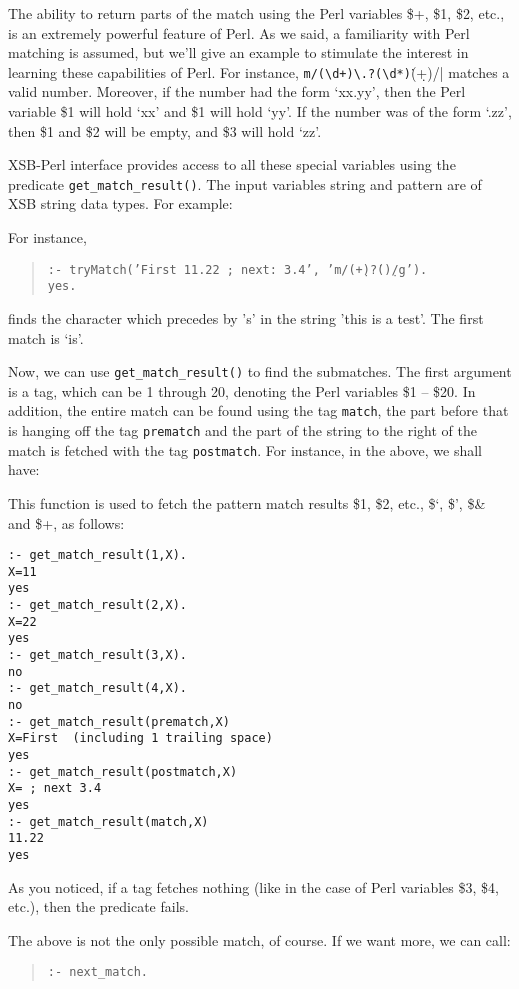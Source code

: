 The ability to return parts of the match using the Perl variables {\$}+,
{\$}1, {\$}2, etc., is an extremely powerful feature of Perl.
As we said, a familiarity with Perl matching is assumed, but we'll give an
example to stimulate the interest in learning these capabilities of Perl.
For instance, \verb|m/(\d+)\.?(\d*)|\.(\d+)/| matches a valid
number. Moreover, if the number had the form `xx.yy', then the Perl variable
\$1 will hold `xx' and \$1 will hold `yy'. If the number was of the form
`.zz', then \$1 and \$2 will be empty, and \$3 will hold `zz'.

XSB-Perl interface provides access to all these special variables using the
predicate {\tt get\_match\_result()}.
The input variables string
and pattern are of XSB string data types. For example:

For instance,
\begin{quote}
 {\tt :- tryMatch('First 11.22 ; next: 3.4', 'm/(\d+)\.?(\d*)/g'). }\\
 {\tt yes.}  
\end{quote}
finds the character which precedes by 's' in the string 'this is a
test'. The first match is `is'.

Now, we can use {\tt get\_match\_result()} to find the submatches.  The
first argument is a tag, which can be 1 through 20, denoting the Perl
variables \$1 -- \$20. In addition, the entire match can be found using the
tag {\tt match}, the part before that is hanging off the tag {\tt prematch}
and the part of the string to the right of the match is fetched with the
tag {\tt postmatch}. For instance, in the above, we shall have: 

This function is used to fetch the pattern match results {\$}1, {\$}2, etc.,
{\$}`, {\$}', {\$}{\&} and {\$}+, as follows:

\begin{verbatim}
:- get_match_result(1,X).
X=11
yes
:- get_match_result(2,X).
X=22
yes
:- get_match_result(3,X).
no
:- get_match_result(4,X).
no
:- get_match_result(prematch,X)
X=First  (including 1 trailing space)
yes
:- get_match_result(postmatch,X)
X= ; next 3.4
yes
:- get_match_result(match,X)
11.22
yes
\end{verbatim}

As you noticed, if a tag fetches nothing (like in the case of Perl
variables \$3, \$4, etc.), then the predicate fails.

The above is not the only possible match, of course. If we want more, we
can call:
\begin{quote}
 {\tt  :- next\_match. }
\end{quote}

